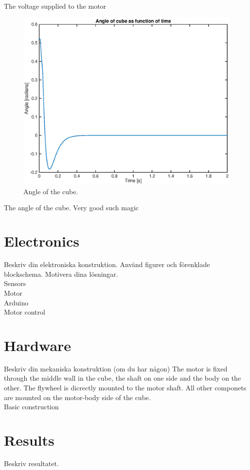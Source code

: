 \documentclass[a4paper,11pt]{kth-mag}
\begin{document}
The voltage supplied to the motor

\begin{figure}[!htb]
\centering
\includegraphics[scale=.7]{angleplot.eps}
\caption{Angle of the cube.}
\label{fig:voltageplot}
\end{figure}

The angle of the cube. Very good such magic


\section{Electronics}
Beskriv din elektroniska konstruktion. Använd figurer och förenklade blockschema. Motivera dina lösningar.
\\ Sensors
\\ Motor
\\ Arduino
\\ Motor control


\section{Hardware}
Beskriv din mekaniska konstruktion (om du har någon)
The motor is fixed through the middle wall in the cube, the shaft on one side and the body on the other. The flywheel is dicrectly mounted to the motor shaft. All other componets are mounted on the motor-body side of the cube.
\\ Basic construction

\section{Results}
Beskriv resultatet.
\end{document}
